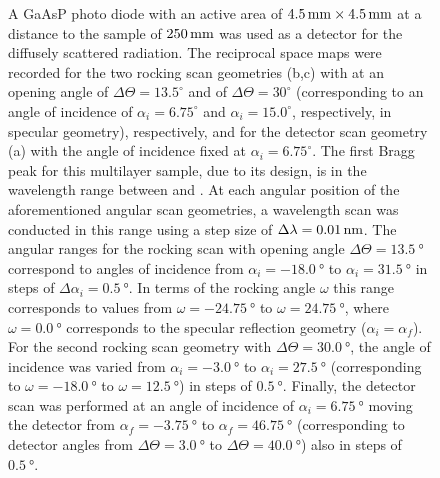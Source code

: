\begin{figure}[htbp]
{        A GaAsP photo diode with an active area of $\mm{4.5} \times \mm{4.5}$ at a distance to the sample of $\mm{250}$ was used as a detector for the diffusely scattered radiation. The reciprocal space maps were recorded for the two rocking scan geometries (b,c) with at an opening angle of $\Delta \Theta = 13.5^\circ$  and of $\Delta \Theta = 30^\circ$ (corresponding to an angle of incidence of $\alpha_i = 6.75^\circ$ and $\alpha_i = 15.0^\circ$, respectively, in specular geometry), respectively, and for the detector scan geometry (a) with the angle of incidence fixed at $\alpha_i = 6.75^\circ$. The first Bragg peak for this multilayer sample, due to its design, is in the wavelength range between  and . At each angular position of the aforementioned angular scan geometries, a wavelength scan was conducted in this range using a step size of $\Delta \lambda = \nm{0.01}$. The angular ranges for the rocking scan with opening angle $\Delta \Theta = \SI{13.5}{\degree}$ correspond to angles of incidence from $\alpha_i = \SI{-18.0}{\degree}$ to $\alpha_i = \SI{31.5}{\degree}$ in steps of $\Delta\alpha_i = \SI{0.5}{\degree}$. In terms of the rocking angle $\omega$ this range corresponds to values from $\omega = \SI{-24.75}{\degree}$ to $\omega = \SI{24.75}{\degree}$, where $\omega = \SI{0.0}{\degree}$ corresponds to the specular reflection geometry ($\alpha_i = \alpha_f$). For the second rocking scan geometry with $\Delta \Theta = \SI{30.0}{\degree}$, the angle of incidence was varied from $\alpha_i = \SI{-3.0}{\degree}$ to $\alpha_i = \SI{27.5}{\degree}$ (corresponding to $\omega = \SI{-18.0}{\degree}$ to $\omega = \SI{12.5}{\degree}$) in steps of $\SI{0.5}{\degree}$. Finally, the detector scan was performed at an angle of incidence of $\alpha_i = \SI{6.75}{\degree}$ moving the detector from $\alpha_f = \SI{-3.75}{\degree}$ to $\alpha_f = \SI{46.75}{\degree}$ (corresponding to detector angles from $\Delta \Theta = \SI{3.0}{\degree}$ to $\Delta \Theta = \SI{40.0}{\degree}$) also in steps of $\SI{0.5}{\degree}$.} \label{ch_diff:fig_PTB17_detector_and_rocking_maps}
\end{figure}

